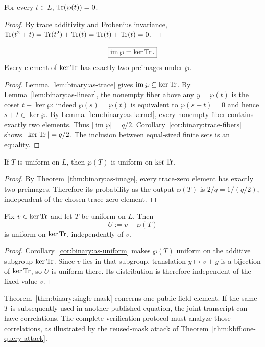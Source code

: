 \begin{lemma}\label{lem:binary:as-trace}
For every $t\in L$, $\operatorname{Tr}(\wp(t))=0$.
\end{lemma}
\begin{proof}
By trace additivity and Frobenius invariance,
$\operatorname{Tr}(t^2+t)=\operatorname{Tr}(t^2)+\operatorname{Tr}(t)=\operatorname{Tr}(t)+\operatorname{Tr}(t)=0$.
\end{proof}

\begin{theorem}\label{thm:binary:as-image}
\[
 \boxed{\operatorname{im}\wp=\ker\operatorname{Tr}.}
\]
Every element of $\ker\operatorname{Tr}$ has exactly two preimages under $\wp$.
\end{theorem}
\begin{proof}
Lemma~\ref{lem:binary:as-trace} gives
$\operatorname{im}\wp\subseteq\ker\operatorname{Tr}$.
By Lemma~\ref{lem:binary:as-linear},
the nonempty fiber above any $y=\wp(t)$ is the coset
$t+\ker\wp$: indeed $\wp(s)=\wp(t)$ is equivalent to
$\wp(s+t)=0$ and hence $s+t\in\ker\wp$.
By Lemma~\ref{lem:binary:as-kernel}, every nonempty fiber
contains exactly two elements. Thus
$|\operatorname{im}\wp|=q/2$.
Corollary~\ref{cor:binary:trace-fibers} shows
$|\ker\operatorname{Tr}|=q/2$. The inclusion between equal-sized finite
sets is an equality.
\end{proof}

\begin{corollary}\label{cor:binary:as-uniform}
If $T$ is uniform on $L$, then $\wp(T)$ is uniform on
$\ker\operatorname{Tr}$.
\end{corollary}
\begin{proof}
By Theorem~\ref{thm:binary:as-image}, every trace-zero
element has exactly two preimages. Therefore its probability
as the output $\wp(T)$ is $2/q=1/(q/2)$, independent of
the chosen trace-zero element.
\end{proof}

\begin{theorem}\label{thm:binary:single-mask}
Fix $v\in\ker\operatorname{Tr}$ and let $T$ be uniform on $L$.
Then
\[
 U:=v+\wp(T)
\]
is uniform on $\ker\operatorname{Tr}$, independently of $v$.
\end{theorem}
\begin{proof}
Corollary~\ref{cor:binary:as-uniform} makes
$\wp(T)$ uniform on the additive subgroup $\ker\operatorname{Tr}$.
Since $v$ lies in that subgroup, translation
$y\mapsto v+y$ is a bijection of $\ker\operatorname{Tr}$,
so $U$ is uniform there. Its distribution is therefore
independent of the fixed value $v$.
\end{proof}

\begin{remark}
Theorem~\ref{thm:binary:single-mask} concerns one public
field element. If the same $T$ is subsequently used in
another published equation, the joint transcript can have
correlations. The complete verification protocol must
analyze those correlations, as illustrated by the
reused-mask attack of Theorem~\ref{thm:kbff:one-query-attack}.
\end{remark}
